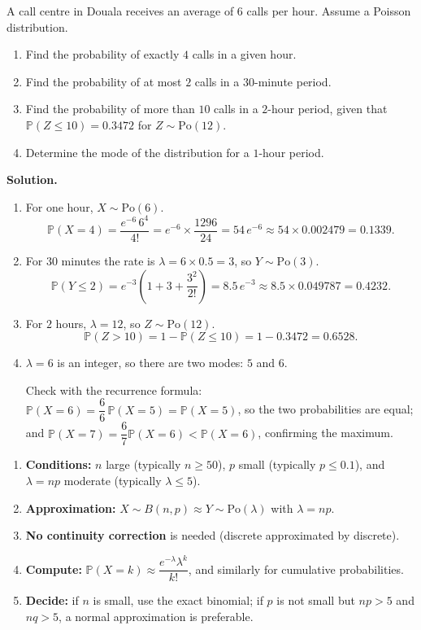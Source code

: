 \documentclass[11pt]{article}
\begin{document}
\begin{exoresolu}
A call centre in Douala receives an average of $6$ calls per hour. Assume a Poisson distribution.
\begin{enumerate}
\item Find the probability of exactly $4$ calls in a given hour.
\item Find the probability of at most $2$ calls in a $30$-minute period.
\item Find the probability of more than $10$ calls in a $2$-hour period, given that $\mathbb{P}(Z \le 10) = 0.3472$ for $Z \sim \mathrm{Po}(12)$.
\item Determine the mode of the distribution for a $1$-hour period.
\end{enumerate}
\tcblower
\textbf{Solution.}
\begin{enumerate}
\item For one hour, $X \sim \mathrm{Po}(6)$.
\[
\mathbb{P}(X = 4) = \frac{e^{-6}\, 6^4}{4!} = e^{-6} \times \frac{1296}{24} = 54\,e^{-6} \approx 54 \times 0.002479 = 0.1339.
\]
\item For $30$ minutes the rate is $\lambda = 6 \times 0.5 = 3$, so $Y \sim \mathrm{Po}(3)$.
\[
\mathbb{P}(Y \le 2) = e^{-3}\left(1 + 3 + \frac{3^2}{2!}\right) = 8.5\,e^{-3} \approx 8.5 \times 0.049787 = 0.4232.
\]
\item For $2$ hours, $\lambda = 12$, so $Z \sim \mathrm{Po}(12)$.
\[
\mathbb{P}(Z > 10) = 1 - \mathbb{P}(Z \le 10) = 1 - 0.3472 = 0.6528.
\]
\item $\lambda = 6$ is an integer, so there are two modes: $5$ and $6$.

Check with the recurrence formula: $\mathbb{P}(X=6) = \dfrac{6}{6}\,\mathbb{P}(X=5) = \mathbb{P}(X=5)$, so the two probabilities are equal; and $\mathbb{P}(X=7) = \dfrac{6}{7}\mathbb{P}(X=6) < \mathbb{P}(X=6)$, confirming the maximum.
\end{enumerate}
\end{exoresolu}

\begin{methode}
\begin{enumerate}
\item \textbf{Conditions:} $n$ large (typically $n \ge 50$), $p$ small (typically $p \le 0.1$), and $\lambda = np$ moderate (typically $\lambda \le 5$).
\item \textbf{Approximation:} $X \sim B(n,p) \approx Y \sim \mathrm{Po}(\lambda)$ with $\lambda = np$.
\item \textbf{No continuity correction} is needed (discrete approximated by discrete).
\item \textbf{Compute:} $\mathbb{P}(X = k) \approx \dfrac{e^{-\lambda}\lambda^k}{k!}$, and similarly for cumulative probabilities.
\item \textbf{Decide:} if $n$ is small, use the exact binomial; if $p$ is not small but $np > 5$ and $nq > 5$, a normal approximation is preferable.
\end{enumerate}
\end{methode}
\end{document}
